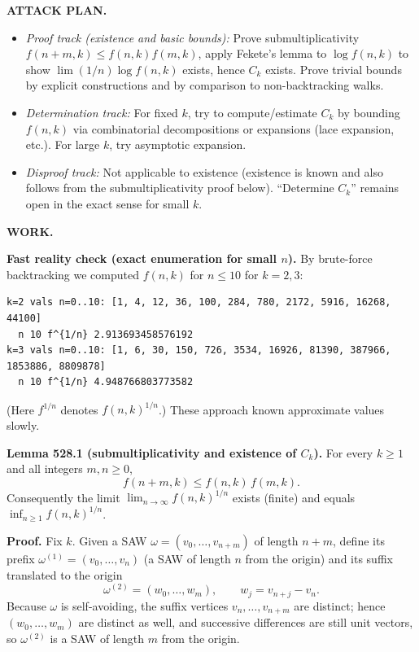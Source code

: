 \bigskip
\noindent\textbf{ATTACK PLAN.}
\begin{itemize}
\item \emph{Proof track (existence and basic bounds):} Prove submultiplicativity $f(n+m,k)\le f(n,k)f(m,k)$, apply Fekete's lemma to $\log f(n,k)$ to show $\lim (1/n)\log f(n,k)$ exists, hence $C_k$ exists. Prove trivial bounds by explicit constructions and by comparison to non-backtracking walks.
\item \emph{Determination track:} For fixed $k$, try to compute/estimate $C_k$ by bounding $f(n,k)$ via combinatorial decompositions or expansions (lace expansion, etc.). For large $k$, try asymptotic expansion.
\item \emph{Disproof track:} Not applicable to existence (existence is known and also follows from the submultiplicativity proof below). ``Determine $C_k$'' remains open in the exact sense for small $k$.
\end{itemize}

\bigskip
\noindent\textbf{WORK.}

\medskip
\noindent\textbf{Fast reality check (exact enumeration for small $n$).}
By brute-force backtracking we computed $f(n,k)$ for $n\le 10$ for $k=2,3$:
\begin{verbatim}
k=2 vals n=0..10: [1, 4, 12, 36, 100, 284, 780, 2172, 5916, 16268, 44100]
  n 10 f^{1/n} 2.913693458576192
k=3 vals n=0..10: [1, 6, 30, 150, 726, 3534, 16926, 81390, 387966, 1853886, 8809878]
  n 10 f^{1/n} 4.948766803773582
\end{verbatim}
(Here $f^{1/n}$ denotes $f(n,k)^{1/n}$.) These approach known approximate values slowly.

\medskip
\noindent\textbf{Lemma 528.1 (submultiplicativity and existence of $C_k$).}
For every $k\ge 1$ and all integers $m,n\ge 0$,
\[f(n+m,k)\le f(n,k)\,f(m,k).
\]
Consequently the limit $\lim_{n\to\infty} f(n,k)^{1/n}$ exists (finite) and equals $\inf_{n\ge 1} f(n,k)^{1/n}$.

\noindent\textbf{Proof.}
Fix $k$.
Given a SAW $\omega=(v_0,\dots,v_{n+m})$ of length $n+m$, define its prefix $\omega^{(1)}=(v_0,\dots,v_n)$ (a SAW of length $n$ from the origin) and its suffix translated to the origin
\[\omega^{(2)} = (w_0,\dots,w_m),\qquad w_j = v_{n+j}-v_n.
\]
Because $\omega$ is self-avoiding, the suffix vertices $v_n,\dots,v_{n+m}$ are distinct; hence $(w_0,\dots,w_m)$ are distinct as well, and successive differences are still unit vectors, so $\omega^{(2)}$ is a SAW of length $m$ from the origin.

